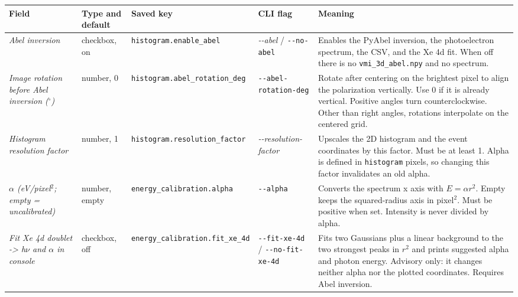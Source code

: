 \documentclass[11pt,a4paper]{article}
\newcommand{\code}[1]{\texttt{#1}}
\begin{document}
\begin{center}
\footnotesize
\begin{longtable}{@{}L{3.4cm}L{2.3cm}L{2.5cm}L{2.8cm}L{4.9cm}@{}}
\toprule
Field & Type and default & Saved key & CLI flag & Meaning \\
\midrule
\endhead
\bottomrule
\endfoot
\emph{Abel inversion} & checkbox, on & \code{histogram.\allowbreak{}enable\_\allowbreak{}abel} &
\emph{-\allowbreak{}-\allowbreak{}abel} / \code{-\allowbreak{}-\allowbreak{}no-\allowbreak{}abel} & Enables the PyAbel inversion, the
photoelectron spectrum, the CSV, and the Xe 4d fit. When off there is no
\code{vmi\_\allowbreak{}3d\_\allowbreak{}abel.npy} and no spectrum. \\
\addlinespace
\emph{Image rotation before Abel inversion ($^\circ$)} & number, 0 & \code{histogram.\allowbreak{}abel\_\allowbreak{}rotation\_\allowbreak{}deg} &
\code{-\allowbreak{}-\allowbreak{}abel-\allowbreak{}rotation-\allowbreak{}deg} & Rotate after centering on the brightest pixel
to align the polarization vertically. Use 0 if it is already vertical.
Positive angles turn counterclockwise. Other than right angles, rotations
interpolate on the centered grid. \\
\addlinespace
\emph{Histogram resolution factor} & number, 1 & \code{histogram.\allowbreak{}resolution\_\allowbreak{}factor} &
\emph{-\allowbreak{}-\allowbreak{}resolution-\allowbreak{}factor} & Upscales the 2D histogram and the event
coordinates by this factor. Must be at least 1. Alpha is defined in
\code{histogram} pixels, so changing this factor invalidates an old alpha. \\
\addlinespace
\emph{$\alpha$ (eV/\allowbreak{}pixel$^2$; empty = uncalibrated)} & number, empty &
\code{energy\_\allowbreak{}calibration.alpha} & \code{-\allowbreak{}-\allowbreak{}alpha} & Converts the spectrum x
axis with $E = \alpha r^2$. Empty keeps the squared-radius axis in
pixel$^2$. Must be positive when set. Intensity is never divided by alpha. \\
\addlinespace
\emph{Fit Xe 4d doublet -\allowbreak{}> h$\nu$ and $\alpha$ in console} & checkbox, off &
\code{energy\_\allowbreak{}calibration.fit\_\allowbreak{}xe\_\allowbreak{}4d} & \code{-\allowbreak{}-\allowbreak{}fit-\allowbreak{}xe-\allowbreak{}4d} / \code{-\allowbreak{}-\allowbreak{}no-\allowbreak{}fit-\allowbreak{}xe-\allowbreak{}4d}
& Fits two Gaussians plus a linear background to the two strongest peaks in
$r^2$ and prints suggested alpha and photon energy. Advisory only: it changes
neither alpha nor the plotted coordinates. Requires Abel inversion. \\

\end{longtable}
\end{center}
\end{document}
